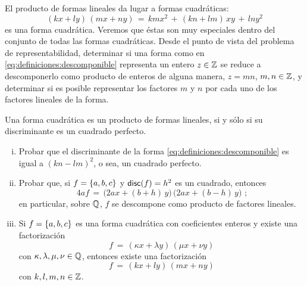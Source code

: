 El producto de formas lineales da lugar a formas cuadr\'aticas:
\begin{equation}
	\label{eq:definiciones:descomponible}
	(kx+ly)\,(mx+ny)\,=\,kmx^2\,+\,(kn+lm)\,xy\,+\,lny^2
\end{equation}
%
es una forma cuadr\'atica. Veremos que \'estas son muy especiales
dentro del conjunto de todas las formas cuadr\'aticas. Desde el punto
de vista del problema de representabilidad, determinar si una forma
como en \eqref{eq:definiciones:descomponible} representa un entero
$z\in\mathbb{Z}$ se reduce a descomponerlo como producto de enteros
de alguna manera, $z=mn$, $m,n\in\mathbb{Z}$, y determinar si es posible
representar los factores $m$ y $n$ por cada uno de los factores lineales
de la forma.

\begin{ejerDefiniciones}\label{ejer:definiciones:descomponible}
	Una forma cuadr\'atica es un producto de formas lineales,
	si y s\'olo si su discriminante es un cuadrado perfecto.
	\begin{enumerate}[(i)]
		\item\label{item:definiciones:descomponible:i}
			Probar que el discriminante de la forma
			\eqref{eq:definiciones:descomponible} es igual a
			$(kn-lm)^2$, o sea, un cuadrado perfecto.
		\item\label{item:definciones:descomponible:ii}
			Probar que, si $f=\left\{a,b,c\right\}$ y
			$\mathsf{disc}(f)=h^2$ es un cuadrado, entonces
			\begin{displaymath}
				4af\,=\,\big(2ax+(b+h)\,y\big)\,
					\big(2ax+(b-h)\,y\big)
				\text{ ;}
			\end{displaymath}
			en particular,
			sobre $\mathbb{Q}$, $f$ se descompone como
			producto de factores lineales.
		\item\label{item:definciones:descomponible:iii}
			Si $f=\left\{a,b,c\right\}$ es una forma cuadr\'atica
			con coeficientes enteros y existe una
			factorizaci\'on
			\begin{displaymath}
				f\,=\,(\kappa x+\lambda y)\,(\mu x+\nu y)
			\end{displaymath}
			con $\kappa,\lambda,\mu,\nu\in\mathbb{Q}$, entonces
			existe una factorizaci\'on
			\begin{displaymath}
				f\,=\,(kx+ly)\,(mx+ny)
			\end{displaymath}
			con $k,l,m,n\in\mathbb{Z}$.%
	\end{enumerate}
\end{ejerDefiniciones}

